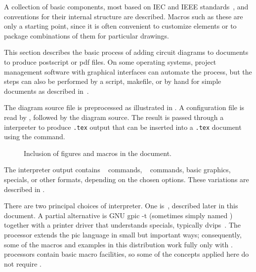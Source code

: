 A collection of basic components, most based on IEC and IEEE
standards~\cite{IECstd,IEEEstd},
and conventions for their internal
structure are described.  Macros such as these are only a starting
point, since it is often convenient to customize elements or to package
combinations of them for particular drawings.

This section describes the basic process of adding circuit diagrams to
\latex documents to produce postscript or pdf files.  On some operating
systems, project management software with graphical interfaces can
automate the process, but the steps can also be performed by a script,
makefile, or by hand for simple documents as described in~.

The diagram source file is preprocessed as illustrated in
.  A configuration file is read by \Mfour,
followed by the diagram source.
The result is passed through a
\pic interpreter to produce {\tt .tex} output that can be inserted
into a {\tt .tex} document using the \verb|| command.

\begin{figure}[ht]
 \caption{Inclusion of figures and macros in the \latex document.
 \label{Flowdiag}}
 \end{figure}

\noindent
The interpreter output contains
\TPGF~\cite{tikz} commands,
\PSTricks~\cite{pstricks} commands,
basic \latex graphics, 
\tpic specials, or other formats,
depending on the chosen options.
These variations are described in .

There are two principal choices of \pic interpreter.  One is~\dpic,
described later in this document.  A partial alternative is
GNU {\bq gpic -t} (sometimes simply named \pic)~\cite{gpic}
together with a printer driver
that understands \tpic specials, typically {\bq dvips}~\cite{dvips}.
The \dpic processor extends the pic language in small but important ways;
consequently, some of the macros and examples in this distribution work fully
only with \dpic.
\Pic processors contain basic macro facilities, so some of the
concepts applied here do not require \Mfour.

